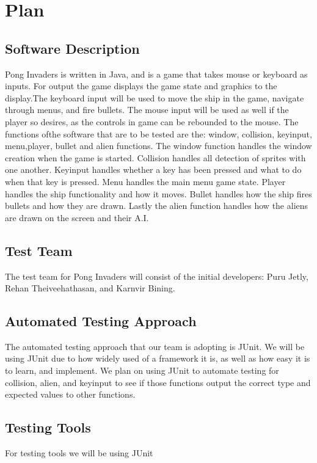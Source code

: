 \documentclass[12pt, titlepage]{article}
\begin{document}
\section{Plan}
	
\subsection{Software Description}
Pong Invaders is written in Java, and is a game that takes mouse or keyboard as
inputs. For output the game displays the game state and graphics to the
display.The keyboard input will be used to move the ship in the game, navigate
through
menus, and fire bullets. The mouse input will be used as well if the player so
desires, as the controls in game can be rebounded to the mouse. The functions
ofthe software that are to be tested are the: window, collision, keyinput,
menu,player, bullet and alien functions. The window function handles the window
creation when the game is started. Collision handles all detection of sprites
with one another. Keyinput handles whether a key has been pressed and what to
do when that key is pressed. Menu handles the main menu game state. Player
handles the ship functionality and how it moves. Bullet handles how the ship
fires
bullets and how they are drawn. Lastly the alien function handles how the
aliens are drawn on the screen and their A.I.

\subsection{Test Team}
The test team for Pong Invaders will consist of the initial developers: Puru
Jetly, Rehan Theiveehathasan, and Karnvir Bining.


\subsection{Automated Testing Approach}
The automated testing approach that our team is adopting is JUnit. We will be
using JUnit due to how widely used of a framework it is, as well as how easy it
is to learn, and implement. We plan on using JUnit to automate testing for
collision, alien, and keyinput to see if those functions output the correct
type and expected values to other functions.


\subsection{Testing Tools}
For testing tools we will be using JUnit
\end{document}
